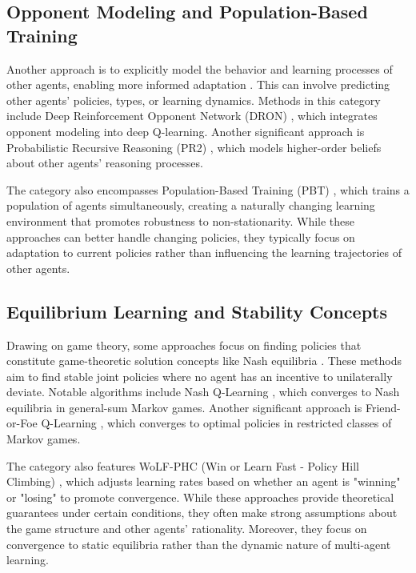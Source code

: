 \subsection{Opponent Modeling and Population-Based Training}
Another approach is to explicitly model the behavior and learning processes of other agents, enabling more informed adaptation \cite{albrecht2018autonomous, he2016opponent}. This can involve predicting other agents' policies, types, or learning dynamics. Methods in this category include Deep Reinforcement Opponent Network (DRON) \cite{he2016opponent}, which integrates opponent modeling into deep Q-learning. Another significant approach is Probabilistic Recursive Reasoning (PR2) \cite{wen2019probabilistic}, which models higher-order beliefs about other agents' reasoning processes.

The category also encompasses Population-Based Training (PBT) \cite{jaderberg2019human}, which trains a population of agents simultaneously, creating a naturally changing learning environment that promotes robustness to non-stationarity. While these approaches can better handle changing policies, they typically focus on adaptation to current policies rather than influencing the learning trajectories of other agents.

\subsection{Equilibrium Learning and Stability Concepts}
Drawing on game theory, some approaches focus on finding policies that constitute game-theoretic solution concepts like Nash equilibria \cite{bowling2005convergence, hu2003nash, littman2001friend}. These methods aim to find stable joint policies where no agent has an incentive to unilaterally deviate. Notable algorithms include Nash Q-Learning \cite{hu2003nash}, which converges to Nash equilibria in general-sum Markov games. Another significant approach is Friend-or-Foe Q-Learning \cite{littman2001friend}, which converges to optimal policies in restricted classes of Markov games.

The category also features WoLF-PHC (Win or Learn Fast - Policy Hill Climbing) \cite{bowling2002multiagent}, which adjusts learning rates based on whether an agent is "winning" or "losing" to promote convergence. While these approaches provide theoretical guarantees under certain conditions, they often make strong assumptions about the game structure and other agents' rationality. Moreover, they focus on convergence to static equilibria rather than the dynamic nature of multi-agent learning.

